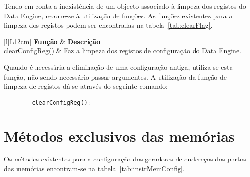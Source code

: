Tendo em conta a inexistência de um objecto associado à limpeza dos registos do Data Engine, recorre-se à utilização de funções. As funções existentes para a limpeza
dos registos podem ser encontradas na tabela~\ref{tab:clearFlag}.




\begin{table}[h!]
    \caption[Funções respectivas à limpeza dos registos.]{Funções respectivas à limpeza dos registos.}
  \begin{center}
    \begin{tabular}{|l|L{12cm}|}
      \hline
      {\bf Função} & {\bf Descrição} \\
      \hline \hline
	clearConfigReg() & Faz a limpeza dos registos de configuração do Data Engine. \\
      \hline
    \end{tabular}
  \end{center}
  \label{tab:clearFlag}
\end{table}


Quando é necessária a eliminação de uma configuração antiga, utiliza-se esta função, não sendo necessário passar argumentos.
A utilização da função de limpeza de registos dá-se através do seguinte comando:

\begin{lstlisting}
		clearConfigReg();
\end{lstlisting}


\section{Métodos exclusivos das memórias}
\label{section:metodos memorias}


Os métodos existentes para a configuração dos geradores de endereços dos portos das memórias encontram-se na tabela~\ref{tab:instrMemConfig}.


